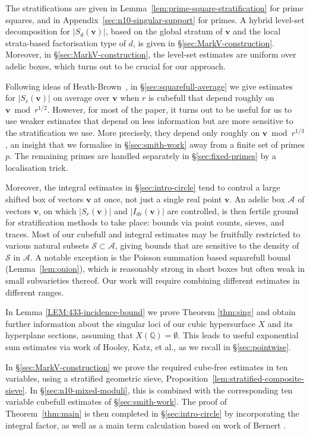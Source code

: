 \documentclass[a4paper,11pt, twoside,reqno]{amsart}
\theoremstyle{plain}
\theoremstyle{definition}
\theoremstyle{remark}
\newcommand{\bfv}{\bm{v}}
\newcommand{\QQ}{\mathbb{Q}}
\numberwithin{equation}{section}
\begin{document}
The stratifications are given
in Lemma~\ref{lem:prime-square-stratification} for prime squares,
and in Appendix~\ref{sec:n10-singular-support} for primes.
A hybrid level-set decomposition for $|S_d(\bfv)|$,
based on the global stratum of $\bfv$
and the local strata-based factorisation type of $d$,
is given in \S\ref{sec:MarkV-construction}.
Moreover, in \S\ref{sec:MarkV-construction},
the level-set estimates are uniform over adelic boxes,
which turns out to be crucial for our approach.

Following ideas of Heath-Brown~\cite{hb10}, in \S\ref{sec:squarefull-average} we give
estimates for $|S_r(\bfv)|$ on average over $\bfv$ when $r$ is cubefull that depend roughly on $\bfv\bmod{r^{1/2}}$. However, for most of the paper, it turns out to be useful for us to use weaker estimates that depend on less information but are more sensitive to the stratification we use.
More precisely, they depend only roughly on $\bfv\bmod{r^{1/3}}$,
an insight that we formalise in \S\ref{sec:smith-work}
away from a finite set of primes $p$.
The remaining primes are handled separately in \S\ref{sec:fixed-primes}
by a localisation trick.



Moreover, the integral estimates in \S\ref{sec:intro-circle} tend to control
a large shifted box of vectors $\bfv$ at once,
not just a single real point $\bfv$.
An adelic box $\mathcal{A}$ of vectors $\bfv$,
on which $|S_r(\bfv)|$ and $|I_{dr}(\bfv)|$ are controlled,
is then fertile ground for stratification methods to take place:
bounds via point counts,
sieves,
and traces.
Most of our cubefull and integral estimates
may be fruitfully restricted to various natural subsets $\mathcal{S} \subset \mathcal{A}$,
giving bounds that are sensitive to the density of $\mathcal{S}$ in $\mathcal{A}$.
A notable exception is the Poisson summation based squarefull bound (Lemma~\ref{lem:onion}), which is reasonably strong in short boxes
but often weak in small subvarieties thereof.
Our work will require combining different estimates in different ranges.

In Lemma \ref{LEM:433-incidence-bound} we prove Theorem
\ref{thm:sing} and obtain further  information about the singular loci of
our cubic hypersurface $X$
and its hyperplane sections,
assuming that $X(\QQ) = \emptyset$.
This leads to useful exponential sum estimates via work of Hooley, Katz, et al.,
as we recall in \S\ref{sec:pointwise}.

In \S\ref{sec:MarkV-construction} we prove the required
cube-free estimates in ten variables,
using a stratified geometric sieve, Proposition~\ref{lem:stratified-composite-sieve}.
In \S\ref{sec:n10-mixed-moduli},
this is combined with the corresponding
ten variable cubefull estimates of \S\ref{sec:smith-work}.
The proof of Theorem~\ref{thm:main} is then completed in \S\ref{sec:intro-circle}
by incorporating the integral factor,
as well as a main term calculation based on work of Bernert \cite{Ber25}.
\end{document}
